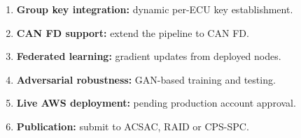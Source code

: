 \documentclass[12pt,a4paper]{amritareport}
\begin{document}
\begin{enumerate}
    \item \textbf{Group key integration:} dynamic per-ECU key establishment.
    \item \textbf{CAN FD support:} extend the pipeline to CAN FD.
    \item \textbf{Federated learning:} gradient updates from deployed nodes.
    \item \textbf{Adversarial robustness:} GAN-based training and testing.
    \item \textbf{Live AWS deployment:} pending production account approval.
    \item \textbf{Publication:} submit to ACSAC, RAID or CPS-SPC.
\end{enumerate}

\end{document}
